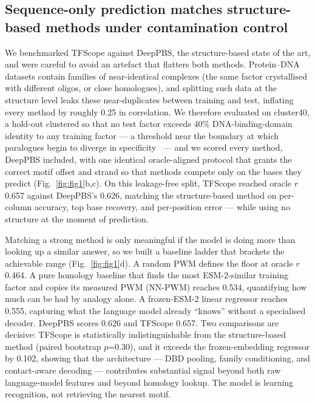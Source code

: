 \documentclass[11pt,letterpaper]{article}
\begin{document}
\subsection*{Sequence-only prediction matches structure-based methods under contamination control}
We benchmarked TFScope against DeepPBS, the structure-based state of the art, and were careful to
avoid an artefact that flatters both methods. Protein--DNA datasets contain families of
near-identical complexes (the same factor crystallised with different oligos, or close
homologues), and splitting such data at the structure level leaks these near-duplicates between
training and test, inflating every method by roughly 0.25 in correlation. We therefore evaluated
on cluster40, a hold-out clustered so that no test factor exceeds 40\% DNA-binding-domain
identity to any training factor --- a threshold near the boundary at which paralogues begin to
diverge in specificity~\cite{LiGodzik2006} --- and we scored every method, DeepPBS included, with
one identical oracle-aligned protocol that grants the correct motif offset and strand so that
methods compete only on the bases they predict (Fig.~\ref{fig:fig1}b,c). On this leakage-free
split, TFScope reached oracle $r$ 0.657 against DeepPBS's 0.626, matching the structure-based
method on per-column accuracy, top base recovery, and per-position error --- while using no
structure at the moment of prediction.

Matching a strong method is only meaningful if the model is doing more than looking up a similar
answer, so we built a baseline ladder that brackets the achievable range (Fig.~\ref{fig:fig1}d).
A random PWM defines the floor at oracle $r$ 0.464. A pure homology baseline that finds the most
ESM-2-similar training factor and copies its measured PWM (NN-PWM) reaches 0.534, quantifying how
much can be had by analogy alone. A frozen-ESM-2 linear regressor reaches 0.555, capturing what
the language model already ``knows'' without a specialised decoder. DeepPBS scores 0.626 and
TFScope 0.657. Two comparisons are decisive: TFScope is statistically indistinguishable from the
structure-based method (paired bootstrap $p$=0.30), and it exceeds the frozen-embedding
regressor by 0.102, showing that the architecture --- DBD pooling, family conditioning, and
contact-aware decoding --- contributes substantial signal beyond both raw language-model features
and beyond homology lookup. The model is learning recognition, not retrieving the nearest motif.
\end{document}
